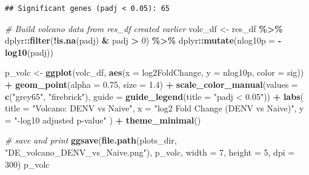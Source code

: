 \documentclass[
]{article}
\newenvironment{Shaded}{\begin{snugshade}}{\end{snugshade}}
\newcommand{\AttributeTok}[1]{\textcolor[rgb]{0.13,0.29,0.53}{#1}}
\newcommand{\CommentTok}[1]{\textcolor[rgb]{0.56,0.35,0.01}{\textit{#1}}}
\newcommand{\DecValTok}[1]{\textcolor[rgb]{0.00,0.00,0.81}{#1}}
\newcommand{\FloatTok}[1]{\textcolor[rgb]{0.00,0.00,0.81}{#1}}
\newcommand{\FunctionTok}[1]{\textcolor[rgb]{0.13,0.29,0.53}{\textbf{#1}}}
\newcommand{\NormalTok}[1]{#1}
\newcommand{\OtherTok}[1]{\textcolor[rgb]{0.56,0.35,0.01}{#1}}
\newcommand{\SpecialCharTok}[1]{\textcolor[rgb]{0.81,0.36,0.00}{\textbf{#1}}}
\newcommand{\StringTok}[1]{\textcolor[rgb]{0.31,0.60,0.02}{#1}}
\begin{document}
\begin{verbatim}
## Significant genes (padj < 0.05): 65
\end{verbatim}

\begin{Shaded}
\begin{Highlighting}[]
\CommentTok{\# Build volcano data from res\_df created earlier}
\NormalTok{volc\_df }\OtherTok{\textless{}{-}}\NormalTok{ res\_df }\SpecialCharTok{\%\textgreater{}\%}
\NormalTok{  dplyr}\SpecialCharTok{::}\FunctionTok{filter}\NormalTok{(}\SpecialCharTok{!}\FunctionTok{is.na}\NormalTok{(padj) }\SpecialCharTok{\&}\NormalTok{ padj }\SpecialCharTok{\textgreater{}} \DecValTok{0}\NormalTok{) }\SpecialCharTok{\%\textgreater{}\%}
\NormalTok{  dplyr}\SpecialCharTok{::}\FunctionTok{mutate}\NormalTok{(}\AttributeTok{nlog10p =} \SpecialCharTok{{-}}\FunctionTok{log10}\NormalTok{(padj))}

\NormalTok{p\_volc }\OtherTok{\textless{}{-}} \FunctionTok{ggplot}\NormalTok{(volc\_df, }\FunctionTok{aes}\NormalTok{(}\AttributeTok{x =}\NormalTok{ log2FoldChange, }\AttributeTok{y =}\NormalTok{ nlog10p, }\AttributeTok{color =}\NormalTok{ sig)) }\SpecialCharTok{+}
  \FunctionTok{geom\_point}\NormalTok{(}\AttributeTok{alpha =} \FloatTok{0.75}\NormalTok{, }\AttributeTok{size =} \FloatTok{1.4}\NormalTok{) }\SpecialCharTok{+}
  \FunctionTok{scale\_color\_manual}\NormalTok{(}\AttributeTok{values =} \FunctionTok{c}\NormalTok{(}\StringTok{"grey65"}\NormalTok{, }\StringTok{"firebrick"}\NormalTok{), }\AttributeTok{guide =} \FunctionTok{guide\_legend}\NormalTok{(}\AttributeTok{title =} \StringTok{"padj \textless{} 0.05"}\NormalTok{)) }\SpecialCharTok{+}
  \FunctionTok{labs}\NormalTok{(}
    \AttributeTok{title =} \StringTok{"Volcano: DENV vs Naive"}\NormalTok{,}
    \AttributeTok{x =} \StringTok{"log2 Fold Change (DENV vs Naive)"}\NormalTok{,}
    \AttributeTok{y =} \StringTok{"{-}log10 adjusted p{-}value"}
\NormalTok{  ) }\SpecialCharTok{+}
  \FunctionTok{theme\_minimal}\NormalTok{()}

\CommentTok{\# save and print}
\FunctionTok{ggsave}\NormalTok{(}\FunctionTok{file.path}\NormalTok{(plots\_dir, }\StringTok{"DE\_volcano\_DENV\_vs\_Naive.png"}\NormalTok{),}
\NormalTok{       p\_volc, }\AttributeTok{width =} \DecValTok{7}\NormalTok{, }\AttributeTok{height =} \DecValTok{5}\NormalTok{, }\AttributeTok{dpi =} \DecValTok{300}\NormalTok{)}
\NormalTok{p\_volc}
\end{Highlighting}
\end{Shaded}
\end{document}
